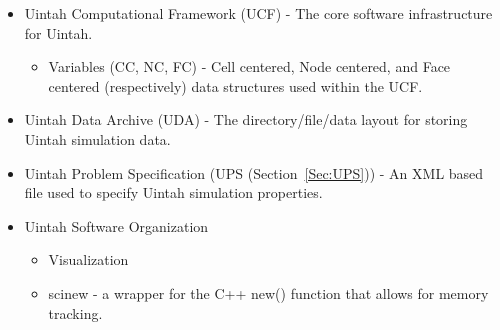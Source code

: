 \begin{itemize}
\item Uintah Computational Framework (UCF) - The core software
  infrastructure for Uintah.
  \begin{itemize}
    \item Variables (CC, NC, FC) - Cell centered, Node centered, and
      Face centered (respectively) data structures used within the UCF.
  \end{itemize}

\item Uintah Data Archive (UDA) - The directory/file/data layout for
  storing Uintah simulation data.

\item Uintah Problem Specification (UPS (Section~\ref{Sec:UPS})) - An XML based file used to
  specify Uintah simulation properties.

\item Uintah Software Organization
  \begin{itemize}
    \item Visualization
    \item scinew - a wrapper for the C++ new() function that allows for memory tracking.
  \end{itemize}

\end{itemize}
